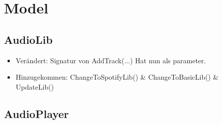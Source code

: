 \documentclass[../implementierung.tex]{subfiles}
\begin{document}
	\section{Model}
		\subsection{AudioLib}
			\begin{itemize}
				\item Verändert: Signatur von AddTrack(...) Hat nun  als parameter.
				\item Hinzugekommen: ChangeToSpotifyLib() \& ChangeToBasicLib() \& UpdateLib()
			\end{itemize}
		\subsection{AudioPlayer}
			\begin{itemize}
			\end{itemize}
\end{document}

